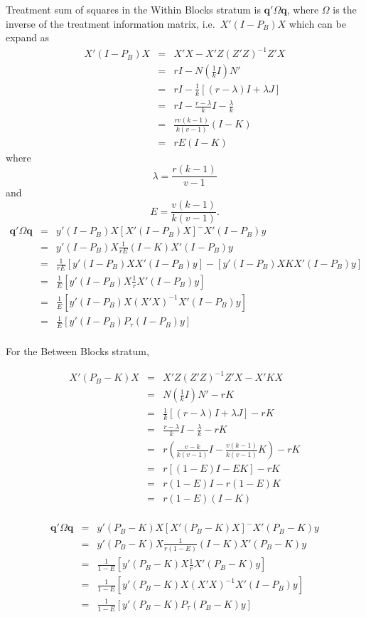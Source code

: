 \documentclass[11pt,a4paper]{article}
\begin{document}
Treatment sum of squares in the Within Blocks stratum is $\bm{q}' \Omega \bm{q}$, where $\Omega$ is the inverse of the treatment information matrix, i.e.\ $X'(I - P_{B})X$ which can be expand as
\begin{eqnarray}
X'(I - P_{B})X 	&=& X'X - X'Z(Z'Z)^{-1}Z'X\\
				&=& rI - N\left(\frac{1}{k} I \right)N'\\
				&=& rI -\frac{1}{k}[(r-\lambda)I + \lambda J] \\
				&=& rI -\frac{r-\lambda}{k} I -\frac{\lambda}{k}\\	
				&=&  \frac{rv(k-1)}{k(v-1)}	(I - K)\\
				&=& rE(I-K)		
\end{eqnarray}
where 
\[
\lambda = \frac{r(k-1)}{v-1}
\]
and 
\[
E = \frac{v(k-1)}{k(v-1)}.
\]
\begin{eqnarray}
\bm{q}' \Omega \bm{q} 	&=& y'(I - P_{B}) X[X'(I - P_{B})X]^{-}X'(I - P_{B})y\\
				&=& y'(I - P_{B}) X \frac{1}{rE}(I-K) X'(I - P_{B})y\\
				&=& \frac{1}{rE} [y'(I - P_{B}) X X'(I - P_{B})y] - [y'(I - P_{B}) X K X'(I - P_{B})y]\\
				&=& \frac{1}{E} [y'(I - P_{B}) X\frac{1}{r} X'(I - P_{B})y]\\	
				&=& \frac{1}{E} [y'(I - P_{B}) X (X'X)^{-1} X'(I - P_{B})y]\\
				&=& \frac{1}{E} [y'(I - P_{B}) P_{\tau}(I - P_{B})y]\\	
\end{eqnarray}

For the Between Blocks stratum, 

\begin{eqnarray}
X'(P_{B} - K)X 	&=& X'Z(Z'Z)^{-1}Z'X - X'KX\\
				&=& N\left(\frac{1}{k} I \right)N' - rK\\
				&=& \frac{1}{k}[(r-\lambda)I + \lambda J] - rK\\
				&=& \frac{r-\lambda}{k} I -\frac{\lambda}{k}- rK\\	
				&=&  r \left( \frac{v-k}{k(v-1)} I - \frac{v(k-1)}{k(v-1)}K \right) -rK\\
				&=& r[(1-E)I - EK] - rK \\
				&=& r(1-E)I - r(1-E)K \\
				&=& r(1-E)(I - K) \\
\end{eqnarray}

\begin{eqnarray}
\bm{q}' \Omega \bm{q} 	&=& y'(P_{B} - K) X[X'(P_{B} - K)X]^{-}X'(P_{B} - K)y\\
				&=& y'(P_{B} - K) X \frac{1}{r(1-E)}(I - K) X'(P_{B} - K)y\\
				&=& \frac{1}{1-E} [y'(P_{B} - K) X\frac{1}{r} X'(P_{B} - K)y]\\	
				&=& \frac{1}{1-E} [y'(P_{B} - K) X (X'X)^{-1} X'(I - P_{B})y]\\
				&=& \frac{1}{1-E} [y'(P_{B} - K) P_{\tau}(P_{B} - K)y]\\	
\end{eqnarray}
\end{document}
